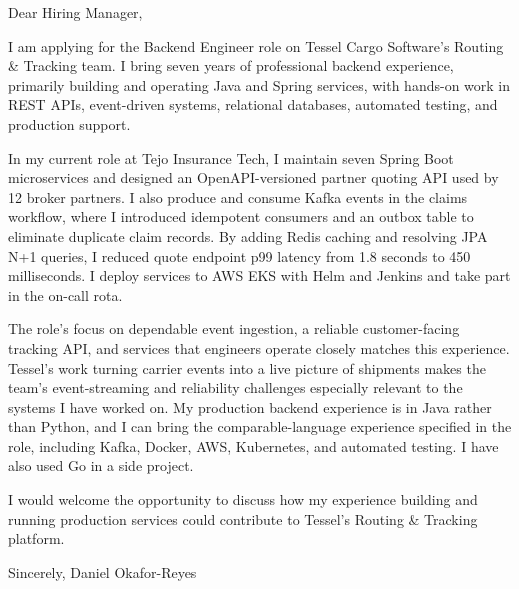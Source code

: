\documentclass[11pt,a4paper]{article}
\begin{document}
Dear Hiring Manager,

I am applying for the Backend Engineer role on Tessel Cargo Software’s Routing & Tracking team. I bring seven years of professional backend experience, primarily building and operating Java and Spring services, with hands-on work in REST APIs, event-driven systems, relational databases, automated testing, and production support.

In my current role at Tejo Insurance Tech, I maintain seven Spring Boot microservices and designed an OpenAPI-versioned partner quoting API used by 12 broker partners. I also produce and consume Kafka events in the claims workflow, where I introduced idempotent consumers and an outbox table to eliminate duplicate claim records. By adding Redis caching and resolving JPA N+1 queries, I reduced quote endpoint p99 latency from 1.8 seconds to 450 milliseconds. I deploy services to AWS EKS with Helm and Jenkins and take part in the on-call rota.

The role’s focus on dependable event ingestion, a reliable customer-facing tracking API, and services that engineers operate closely matches this experience. Tessel’s work turning carrier events into a live picture of shipments makes the team’s event-streaming and reliability challenges especially relevant to the systems I have worked on. My production backend experience is in Java rather than Python, and I can bring the comparable-language experience specified in the role, including Kafka, Docker, AWS, Kubernetes, and automated testing. I have also used Go in a side project.

I would welcome the opportunity to discuss how my experience building and running production services could contribute to Tessel’s Routing & Tracking platform.

Sincerely,
Daniel Okafor-Reyes
\end{document}
